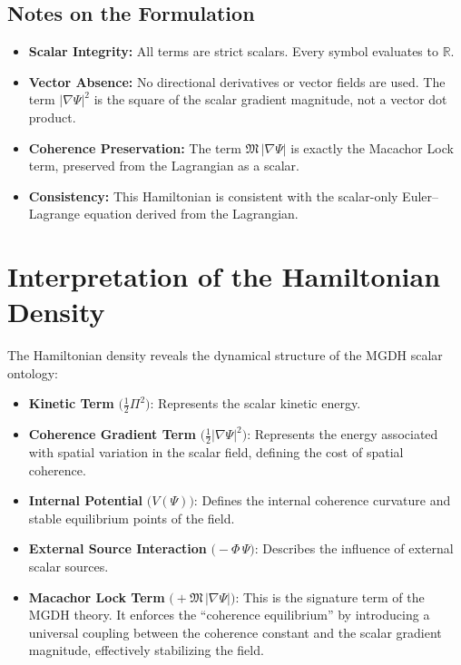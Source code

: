 \documentclass[11pt,a4paper]{article}
\theoremstyle{definition}
\theoremstyle{plain}
\newcommand{\M}{\mathfrak{M}}
\begin{document}
\subsection{Notes on the Formulation}

\begin{itemize}[leftmargin=2em]
    \item \textbf{Scalar Integrity:} All terms are strict scalars. Every symbol evaluates to $\mathbb{R}$.
    \item \textbf{Vector Absence:} No directional derivatives or vector fields are used. The term $|\nabla\Psi|^{2}$ is the square of the scalar gradient magnitude, not a vector dot product.
    \item \textbf{Coherence Preservation:} The term $\M\,|\nabla\Psi|$ is exactly the Macachor Lock term, preserved from the Lagrangian as a scalar.
    \item \textbf{Consistency:} This Hamiltonian is consistent with the scalar-only Euler--Lagrange equation derived from the Lagrangian.
\end{itemize}

\section{Interpretation of the Hamiltonian Density}\label{sec:interpretation}

The Hamiltonian density reveals the dynamical structure of the MGDH scalar ontology:

\begin{itemize}[leftmargin=2em]
    \item \textbf{Kinetic Term} $\bigl(\tfrac{1}{2}\Pi^{2}\bigr)$: Represents the scalar kinetic energy.
    \item \textbf{Coherence Gradient Term} $\bigl(\tfrac{1}{2}|\nabla\Psi|^{2}\bigr)$: Represents the energy associated with spatial variation in the scalar field, defining the cost of spatial coherence.
    \item \textbf{Internal Potential} $\bigl(V(\Psi)\bigr)$: Defines the internal coherence curvature and stable equilibrium points of the field.
    \item \textbf{External Source Interaction} $\bigl(-\Phi\,\Psi\bigr)$: Describes the influence of external scalar sources.
    \item \textbf{Macachor Lock Term} $\bigl(+\M\,|\nabla\Psi|\bigr)$: This is the signature term of the MGDH theory. It enforces the ``coherence equilibrium'' by introducing a universal coupling between the coherence constant and the scalar gradient magnitude, effectively stabilizing the field.
\end{itemize}
\end{document}
